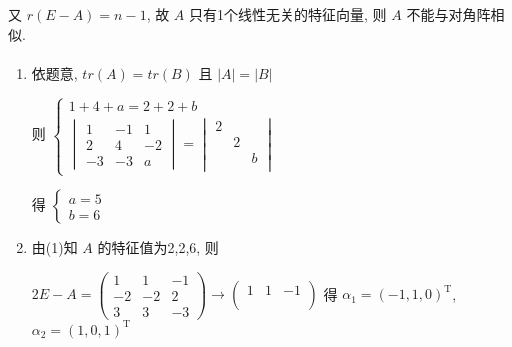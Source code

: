          又 \( r(E-A) = n-1 \), 故 \( A \) 只有1个线性无关的特征向量, 则 \( A \) 不能与对角阵相似.


     \paragraph{} %
         \begin{enumerate}
             \item %
                   依题意, \( tr(A) = tr(B) \) 且 \( |A| = |B| \)

                   则 \( \begin{cases}
                       1+4+a = 2+2+b \\
                       \begin{vmatrix}
                           1  & -1 & 1  \\
                           2  & 4  & -2 \\
                           -3 & -3 & a
                       \end{vmatrix} = \begin{vmatrix}
                                           2 &   &   \\
                                             & 2 &   \\
                                             &   & b \\
                                       \end{vmatrix}
                   \end{cases} \)

                   得 \( \begin{cases}
                       a = 5 \\
                       b = 6
                   \end{cases} \)
             \item %
                   由(1)知 \( A \) 的特征值为2,2,6, 则

                   \( 2E-A = \begin{pmatrix}
                       1  & 1  & -1 \\
                       -2 & -2 & 2  \\
                       3  & 3  & -3
                   \end{pmatrix} \rightarrow \begin{pmatrix}
                       1 & 1 & -1 \\
                         &   &    \\
                         &   &
                   \end{pmatrix} \) 得 \( \alpha_{1} = (-1,1,0)^{\mathrm{T}} \), \( \alpha_{2} = (1,0,1)^{\mathrm{T}} \)


\end{enumerate}
